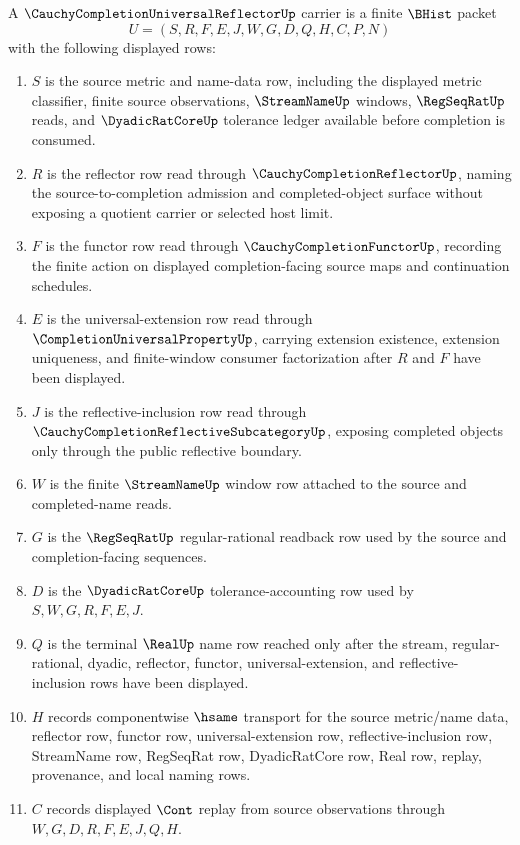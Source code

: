 \begin{definition}
\label{def:cauchy-completion-universal-reflector-carrier}
A $\CauchyCompletionUniversalReflectorUp$ carrier is a finite $\BHist$ packet
$$
U=(S,R,F,E,J,W,G,D,Q,H,C,P,N)
$$
with the following displayed rows:
\begin{enumerate}
\item $S$ is the source metric and name-data row, including the displayed metric classifier, finite source observations, $\StreamNameUp$ windows, $\RegSeqRatUp$ reads, and $\DyadicRatCoreUp$ tolerance ledger available before completion is consumed.
\item $R$ is the reflector row read through $\CauchyCompletionReflectorUp$, naming the source-to-completion admission and completed-object surface without exposing a quotient carrier or selected host limit.
\item $F$ is the functor row read through $\CauchyCompletionFunctorUp$, recording the finite action on displayed completion-facing source maps and continuation schedules.
\item $E$ is the universal-extension row read through $\CompletionUniversalPropertyUp$, carrying extension existence, extension uniqueness, and finite-window consumer factorization after $R$ and $F$ have been displayed.
\item $J$ is the reflective-inclusion row read through $\CauchyCompletionReflectiveSubcategoryUp$, exposing completed objects only through the public reflective boundary.
\item $W$ is the finite $\StreamNameUp$ window row attached to the source and completed-name reads.
\item $G$ is the $\RegSeqRatUp$ regular-rational readback row used by the source and completion-facing sequences.
\item $D$ is the $\DyadicRatCoreUp$ tolerance-accounting row used by $S,W,G,R,F,E,J$.
\item $Q$ is the terminal $\RealUp$ name row reached only after the stream, regular-rational, dyadic, reflector, functor, universal-extension, and reflective-inclusion rows have been displayed.
\item $H$ records componentwise $\hsame$ transport for the source metric/name data, reflector row, functor row, universal-extension row, reflective-inclusion row, StreamName row, RegSeqRat row, DyadicRatCore row, Real row, replay, provenance, and local naming rows.
\item $C$ records displayed $\Cont$ replay from source observations through $W,G,D,R,F,E,J,Q,H$.

\end{enumerate}
\end{definition}

